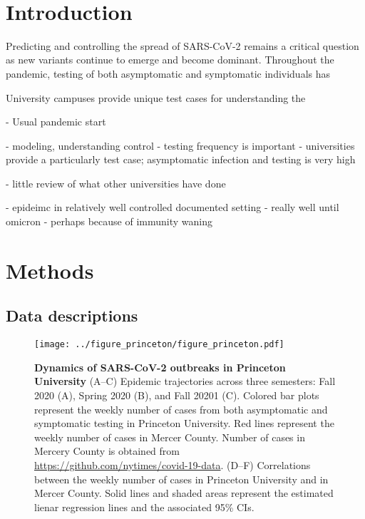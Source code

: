 \documentclass[12pt]{article}
\date{\today}
\begin{document}
\begin{flushleft}{
	\Large
	\textbf{}
}
\newline
\\ 

\end{flushleft} 

\pagebreak

\section{Introduction}

Predicting and controlling the spread of SARS-CoV-2 remains a critical question as new variants continue to emerge and become dominant.
Throughout the pandemic, testing of both asymptomatic and symptomatic individuals has 

University campuses provide unique test cases for understanding the 


- Usual pandemic start

- modeling, understanding control
- testing frequency is important
- universities provide a particularly test case; asymptomatic infection and testing is very high

- little review of what other universities have done

- epideimc in relatively well controlled documented setting
- really well until omicron
- perhaps because of immunity waning 

\section{Methods}

\subsection{Data descriptions}

\begin{figure}[!th]
\texttt{[image: ../figure\_princeton/figure\_princeton.pdf]}
\caption{
\textbf{Dynamics of SARS-CoV-2 outbreaks in Princeton University}
(A--C) Epidemic trajectories across three semesters: Fall 2020 (A), Spring 2020 (B), and Fall 20201 (C).
Colored bar plots represent the weekly number of cases from both asymptomatic and symptomatic testing in Princeton University.
Red lines represent the weekly number of cases in Mercer County.
Number of cases in Mercery County is obtained from \url{https://github.com/nytimes/covid-19-data}.
(D--F) Correlations between the weekly number of cases in Princeton University and in Mercer County.
Solid lines and shaded areas represent the estimated lienar regression lines and the associated 95\% CIs.
\label{fig:princeton}
}
\end{figure}
\end{document}
